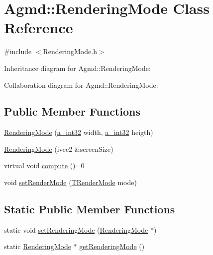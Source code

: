 \hypertarget{class_agmd_1_1_rendering_mode}{\section{Agmd\+:\+:Rendering\+Mode Class Reference}
\label{class_agmd_1_1_rendering_mode}
}


{\ttfamily \#include $<$Rendering\+Mode.\+h$>$}



Inheritance diagram for Agmd\+:\+:Rendering\+Mode\+:


Collaboration diagram for Agmd\+:\+:Rendering\+Mode\+:
\subsection*{Public Member Functions}
\begin{DoxyCompactItemize}
\item 
\hyperlink{class_agmd_1_1_rendering_mode_af13f0a62f876c1a08ae0490cea246869}{Rendering\+Mode} (\hyperlink{_common_defines_8h_ae2e4316e0b924774484a728669bebc9b}{a\+\_\+int32} width, \hyperlink{_common_defines_8h_ae2e4316e0b924774484a728669bebc9b}{a\+\_\+int32} heigth)
\item 
\hyperlink{class_agmd_1_1_rendering_mode_a553cfd81c1ef6caddcb8859e56b0a1eb}{Rendering\+Mode} (ivec2 \&screen\+Size)
\item 
virtual void \hyperlink{class_agmd_1_1_rendering_mode_a6a558c71d87ba840745d347832c2c77c}{compute} ()=0
\item 
void \hyperlink{class_agmd_1_1_rendering_mode_a841947427249a9762ce7d57f9a3f9c9f}{set\+Render\+Mode} (\hyperlink{namespace_agmd_aa4cbd15e55e815e187c31a8f435addae}{T\+Render\+Mode} mode)
\end{DoxyCompactItemize}
\subsection*{Static Public Member Functions}
\begin{DoxyCompactItemize}
\item 
static void \hyperlink{class_agmd_1_1_rendering_mode_a5f40f8fb26c586a54f5dd97bedda478e}{set\+Rendering\+Mode} (\hyperlink{class_agmd_1_1_rendering_mode}{Rendering\+Mode} $\ast$)
\item 
static \hyperlink{class_agmd_1_1_rendering_mode}{Rendering\+Mode} $\ast$ \hyperlink{class_agmd_1_1_rendering_mode_a7f71cb957d3b5f86419d2dd89f31f0d7}{get\+Rendering\+Mode} ()
\end{DoxyCompactItemize}

